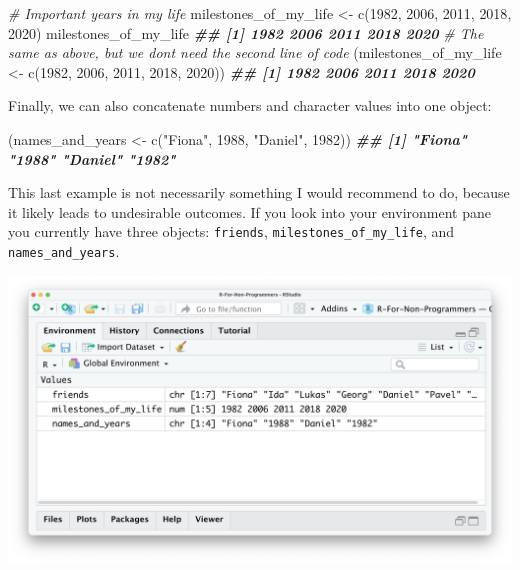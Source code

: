 \documentclass[
]{book}
\newenvironment{Shaded}{\begin{snugshade}}{\end{snugshade}}
\newcommand{\CommentTok}[1]{\textcolor[rgb]{0.56,0.35,0.01}{\textit{#1}}}
\newcommand{\DecValTok}[1]{\textcolor[rgb]{0.00,0.00,0.81}{#1}}
\newcommand{\DocumentationTok}[1]{\textcolor[rgb]{0.56,0.35,0.01}{\textbf{\textit{#1}}}}
\newcommand{\FunctionTok}[1]{\textcolor[rgb]{0.00,0.00,0.00}{#1}}
\newcommand{\NormalTok}[1]{#1}
\newcommand{\OtherTok}[1]{\textcolor[rgb]{0.56,0.35,0.01}{#1}}
\newcommand{\StringTok}[1]{\textcolor[rgb]{0.31,0.60,0.02}{#1}}
\begin{document}
\begin{Shaded}
\begin{Highlighting}[]
\CommentTok{\# Important years in my life}
\NormalTok{milestones\_of\_my\_life }\OtherTok{\textless{}{-}} \FunctionTok{c}\NormalTok{(}\DecValTok{1982}\NormalTok{, }\DecValTok{2006}\NormalTok{, }\DecValTok{2011}\NormalTok{, }\DecValTok{2018}\NormalTok{, }\DecValTok{2020}\NormalTok{)}
\NormalTok{milestones\_of\_my\_life}
\DocumentationTok{\#\# [1] 1982 2006 2011 2018 2020}
\CommentTok{\# The same as above, but we don\textquotesingle{}t need the second line of code}
\NormalTok{(milestones\_of\_my\_life }\OtherTok{\textless{}{-}} \FunctionTok{c}\NormalTok{(}\DecValTok{1982}\NormalTok{, }\DecValTok{2006}\NormalTok{, }\DecValTok{2011}\NormalTok{, }\DecValTok{2018}\NormalTok{, }\DecValTok{2020}\NormalTok{))}
\DocumentationTok{\#\# [1] 1982 2006 2011 2018 2020}
\end{Highlighting}
\end{Shaded}

Finally, we can also concatenate numbers and character values into one object:

\begin{Shaded}
\begin{Highlighting}[]
\NormalTok{(names\_and\_years }\OtherTok{\textless{}{-}} \FunctionTok{c}\NormalTok{(}\StringTok{"Fiona"}\NormalTok{, }\DecValTok{1988}\NormalTok{, }\StringTok{"Daniel"}\NormalTok{, }\DecValTok{1982}\NormalTok{))}
\DocumentationTok{\#\# [1] "Fiona"  "1988"   "Daniel" "1982"}
\end{Highlighting}
\end{Shaded}

This last example is not necessarily something I would recommend to do, because it likely leads to undesirable outcomes. If you look into your environment pane you currently have three objects: \texttt{friends}, \texttt{milestones\_of\_my\_life}, and \texttt{names\_and\_years}.

\includegraphics{images/chapter_05_img/01_basic_computation_environment_objects.png}
\end{document}
